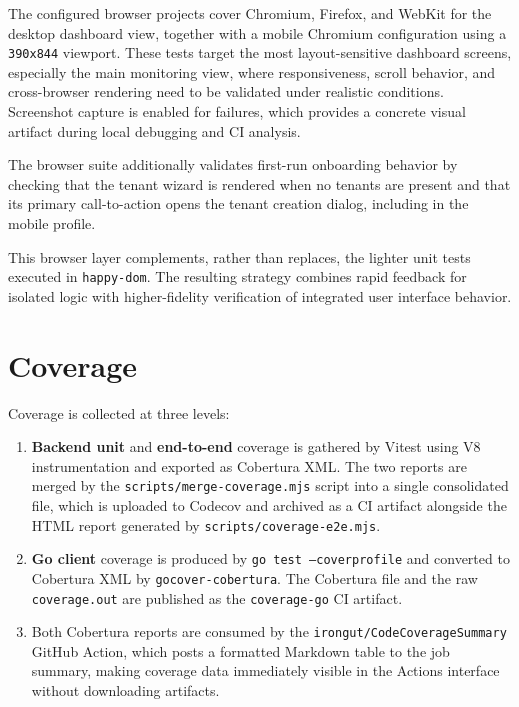 \documentclass[12pt]{report}
\begin{document}
The configured browser projects cover Chromium, Firefox, and WebKit for the
desktop dashboard view, together with a mobile Chromium configuration using a
\texttt{390x844} viewport. These tests target the most layout-sensitive
dashboard screens, especially the main monitoring view, where responsiveness,
scroll behavior, and cross-browser rendering need to be validated under
realistic conditions. Screenshot capture is enabled for failures, which
provides a concrete visual artifact during local debugging and CI analysis.

The browser suite additionally validates first-run onboarding behavior by checking
that the tenant wizard is rendered when no tenants are present and that its
primary call-to-action opens the tenant creation dialog, including in the
mobile profile.

This browser layer complements, rather than replaces, the lighter unit tests
executed in \texttt{happy-dom}. The resulting strategy combines rapid feedback
for isolated logic with higher-fidelity verification of integrated user
interface behavior.

\newpage
\section{Coverage}

Coverage is collected at three levels:

\begin{enumerate}
  \item \textbf{Backend unit} and \textbf{end-to-end} coverage is gathered by
    Vitest using V8 instrumentation and exported as Cobertura XML. The two
    reports are merged by the \texttt{scripts/merge-coverage.mjs} script into a
    single consolidated file, which is uploaded to Codecov and archived as a CI
    artifact alongside the HTML report generated by
    \texttt{scripts/coverage-e2e.mjs}.
  \item \textbf{Go client} coverage is produced by \texttt{go test --coverprofile}
    and converted to Cobertura XML by \texttt{gocover-cobertura}. The Cobertura
    file and the raw \texttt{coverage.out} are published as the \texttt{coverage-go}
    CI artifact.
  \item Both Cobertura reports are consumed by the
    \texttt{irongut/CodeCoverageSummary} GitHub Action, which posts a formatted
    Markdown table to the job summary, making coverage data immediately visible
    in the Actions interface without downloading artifacts.
\end{enumerate}
\end{document}
